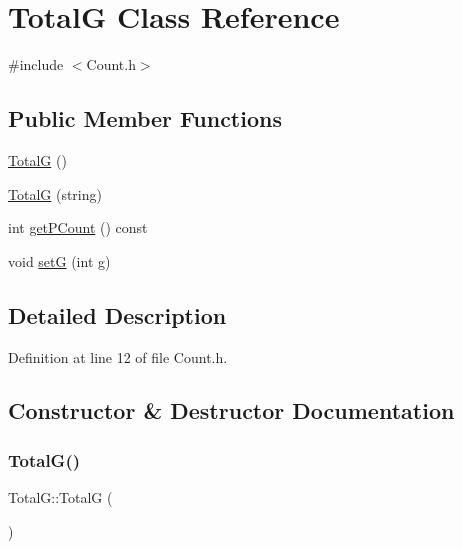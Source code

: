 \hypertarget{class_total_g}{}\section{TotalG Class Reference}
\label{class_total_g}


{\ttfamily \#include $<$Count.\+h$>$}

\subsection*{Public Member Functions}
\begin{DoxyCompactItemize}
\item 
\hyperlink{class_total_g_a9634cd2423b4c45d6c2ba036c3ad250f}{TotalG} ()
\item 
\hyperlink{class_total_g_ad30697833300327ec296534142355f3e}{TotalG} (string)
\item 
int \hyperlink{class_total_g_ad41569165fe712f2b16f8c1fa52ed6fc}{get\+P\+Count} () const
\item 
void \hyperlink{class_total_g_ae03634e9b4b363cad288aa79979b2f90}{setG} (int g)
\end{DoxyCompactItemize}


\subsection{Detailed Description}


Definition at line 12 of file Count.\+h.



\subsection{Constructor \& Destructor Documentation}
\hypertarget{class_total_g_a9634cd2423b4c45d6c2ba036c3ad250f}{}\label{class_total_g_a9634cd2423b4c45d6c2ba036c3ad250f} 
\subsubsection{\texorpdfstring{Total\+G()}{TotalG()}\hspace{0.1cm}{\footnotesize\ttfamily [1/2]}}
{\footnotesize\ttfamily Total\+G\+::\+TotalG (\begin{DoxyParamCaption}{ }\end{DoxyParamCaption})\hspace{0.3cm}{\ttfamily [inline]}}



